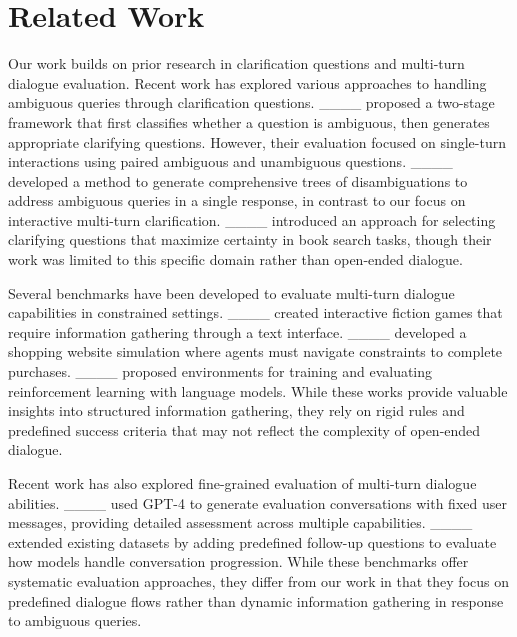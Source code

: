 \section{Related Work}
Our work builds on prior research in clarification questions and multi-turn dialogue evaluation. Recent work has explored various approaches to handling ambiguous queries through clarification questions. ____ proposed a two-stage framework that first classifies whether a question is ambiguous, then generates appropriate clarifying questions. However, their evaluation focused on single-turn interactions using paired ambiguous and unambiguous questions. ____ developed a method to generate comprehensive trees of disambiguations to address ambiguous queries in a single response, in contrast to our focus on interactive multi-turn clarification. ____ introduced an approach for selecting clarifying questions that maximize certainty in book search tasks, though their work was limited to this specific domain rather than open-ended dialogue.

Several benchmarks have been developed to evaluate multi-turn dialogue capabilities in constrained settings. ____ created interactive fiction games that require information gathering through a text interface. ____ developed a shopping website simulation where agents must navigate constraints to complete purchases. ____ proposed environments for training and evaluating reinforcement learning with language models. While these works provide valuable insights into structured information gathering, they rely on rigid rules and predefined success criteria that may not reflect the complexity of open-ended dialogue.

Recent work has also explored fine-grained evaluation of multi-turn dialogue abilities. ____ used GPT-4 to generate evaluation conversations with fixed user messages, providing detailed assessment across multiple capabilities. ____ extended existing datasets by adding predefined follow-up questions to evaluate how models handle conversation progression. While these benchmarks offer systematic evaluation approaches, they differ from our work in that they focus on predefined dialogue flows rather than dynamic information gathering in response to ambiguous queries.